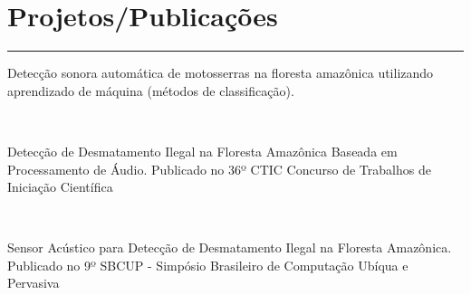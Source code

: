 \documentclass[]{rahulworld-resume}
\begin{document}
\begin{minipage}[t]{0.66\textwidth}
\section{Projetos/Publicações}
\noindent\rule{12.5cm}{0.4pt}
 
\noindent
\hspace{5em}%
\begin{minipage}{0.85\textwidth\vspace{5pt}}
Detecção sonora automática de motosserras na floresta amazônica utilizando aprendizado de máquina (métodos de classificação). 
\end{minipage}\\
 
\noindent
\hspace{5em}%
\begin{minipage}{0.85\textwidth\vspace{5pt}}
Detecção de Desmatamento Ilegal na Floresta Amazônica Baseada em Processamento de Áudio.
Publicado no 36º CTIC Concurso de Trabalhos de Iniciação Científica
\end{minipage}\\
 
\noindent
\hspace{5em}%
\begin{minipage}{0.85\textwidth\vspace{5pt}}
Sensor Acústico para Detecção de Desmatamento Ilegal na Floresta Amazônica.
Publicado no 9º SBCUP - Simpósio Brasileiro de Computação Ubíqua e Pervasiva
\end{minipage}
\end{minipage} 
\end{document}

